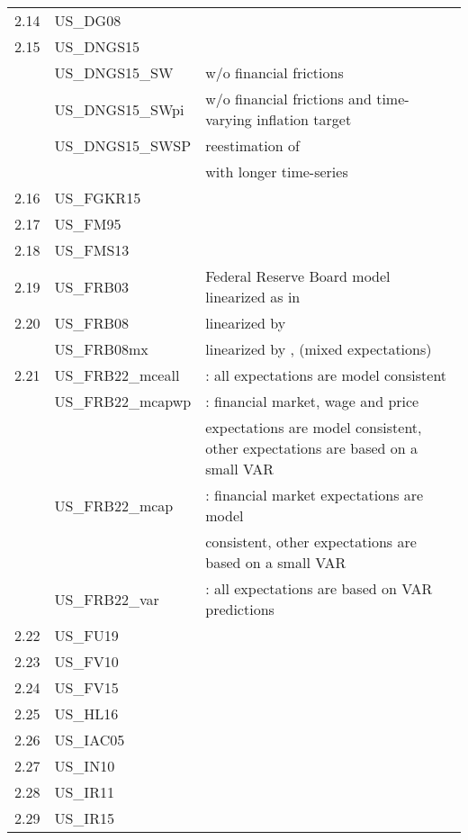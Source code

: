 \documentclass[11pt,a4paper]{article}
\begin{document}
\begin{table}[H]
\begin{tabularx}{\textwidth}{lll}
			2.14	&	US\_DG08	&	\cite{DeGraeve2008}	\\															
			2.15	&	US\_DNGS15	&	\cite{del2015inflation}	\\								
			&	US\_DNGS15\_SW	&	\cite{del2015inflation}	w/o	financial	frictions\\						
			&	US\_DNGS15\_SWpi	&	\cite{del2015inflation}	w/o	financial	frictions	and	time-varying	inflation	target	\\	
			&	US\_DNGS15\_SWSP	&	\cite{del2015inflation}	reestimation	of	\cite{SmetsWouters2007}	\\					
			&	&	with	longer	time-series	\\							
			
			2.16	&	US\_FGKR15	&	\cite{FernandezVillaverdeetal2015}	\\								
			2.17	&	US\_FM95	&	\cite{FuhrerMoore1995}	\\								
			2.18	&	US\_FMS13	&	\cite{Feveetal2013}	\\								
			2.19	&	US\_FRB03	&	Federal	Reserve	Board	model	linearized	as	in	\cite{LevinWielandWilliams2003}	\\	
			2.20\footnotemark[1]	&	US\_FRB08	&	linearized	by	\cite{BraytonLaubach2008}\\%
			&	US\_FRB08mx	&	linearized	by	\cite{BraytonLaubach2008},	(mixed	expectations)	\\			
			2.21& US\_FRB22\_mceall & \cite{brayton2022linver}: all expectations are model consistent\\
			& US\_FRB22\_mcapwp & \cite{brayton2022linver}: financial market, wage and price \\&&expectations are model consistent, other expectations are based on a small VAR\\
			& US\_FRB22\_mcap & \cite{brayton2022linver}: financial market expectations are model\\&& consistent, other expectations are based on a small VAR\\
			& US\_FRB22\_var & \cite{brayton2022linver}: all expectations are based on VAR predictions\\
			2.22	&	US\_FU19	&	\cite{fratto2019uhlig}	\\								
			2.23	&	US\_FV10	&	\cite{fernandez2010econometrics}\\									
			2.24	&	US\_FV15	&	\cite{fernandez2015estimating}\\									
			2.25	&	US\_HL16	&	\cite{hollander2016liu}	\\								
			2.26	&	US\_IAC05	&	\cite{Iacoviello2005}	\\								
			2.27	&	US\_IN10	&	\cite{IacovielloNeri2010}	\\								
			2.28	&	US\_IR11	&	\cite{Ireland2011}	\\								
			2.29	&	US\_IR15	&	\cite{ireland2015monetary}\\									
											

\end{tabularx}
\end{table}
\end{document}
